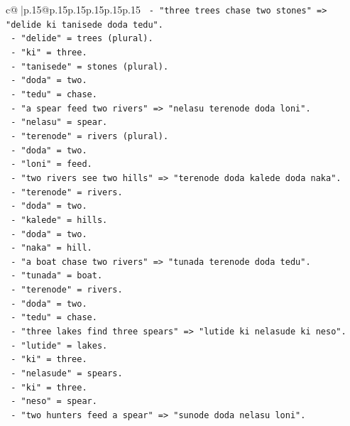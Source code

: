 \documentclass{article}
\begin{document}
{\begin{supertabular}{c@{$\;$}|p{.15\linewidth}@{}p{.15\linewidth}p{.15\linewidth}p{.15\linewidth}p{.15\linewidth}p{.15\linewidth}}
{{{\texttt{       {-} "three trees chase two stones" => "delide ki tanisede doda tedu".} \\
\texttt{         {-} "delide" = trees (plural).} \\
\texttt{         {-} "ki" = three.} \\
\texttt{         {-} "tanisede" = stones (plural).} \\
\texttt{         {-} "doda" = two.} \\
\texttt{         {-} "tedu" = chase.} \\
\texttt{       {-} "a spear feed two rivers" => "nelasu terenode doda loni".} \\
\texttt{         {-} "nelasu" = spear.} \\
\texttt{         {-} "terenode" = rivers (plural).} \\
\texttt{         {-} "doda" = two.} \\
\texttt{         {-} "loni" = feed.} \\
\texttt{       {-} "two rivers see two hills" => "terenode doda kalede doda naka".} \\
\texttt{         {-} "terenode" = rivers.} \\
\texttt{         {-} "doda" = two.} \\
\texttt{         {-} "kalede" = hills.} \\
\texttt{         {-} "doda" = two.} \\
\texttt{         {-} "naka" = hill.} \\
\texttt{       {-} "a boat chase two rivers" => "tunada terenode doda tedu".} \\
\texttt{         {-} "tunada" = boat.} \\
\texttt{         {-} "terenode" = rivers.} \\
\texttt{         {-} "doda" = two.} \\
\texttt{         {-} "tedu" = chase.} \\
\texttt{       {-} "three lakes find three spears" => "lutide ki nelasude ki neso".} \\
\texttt{         {-} "lutide" = lakes.} \\
\texttt{         {-} "ki" = three.} \\
\texttt{         {-} "nelasude" = spears.} \\
\texttt{         {-} "ki" = three.} \\
\texttt{         {-} "neso" = spear.} \\
\texttt{       {-} "two hunters feed a spear" => "sunode doda nelasu loni".} \\
}}}
\end{supertabular}}
\end{document}
